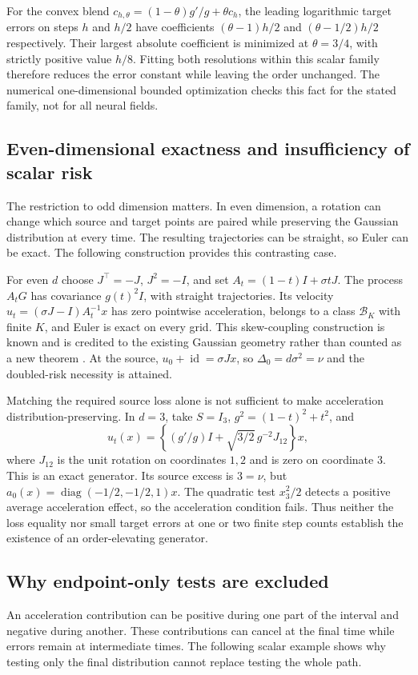 For the convex blend
$c_{h,\theta}=(1-\theta)g'/g+\theta c_h$, the leading logarithmic target
errors on steps $h$ and $h/2$ have coefficients
$(\theta-1)h/2$ and $(\theta-1/2)h/2$ respectively.
Their largest absolute coefficient is minimized at $\theta=3/4$, with
strictly positive value $h/8$. Fitting both resolutions within this scalar
family therefore reduces the error constant while leaving the order
unchanged. The numerical one-dimensional bounded optimization checks
this fact for the stated family, not for all neural fields.

\subsection{Even-dimensional exactness and insufficiency of scalar risk}
The restriction to odd dimension matters. In even dimension, a rotation
can change which source and target points are paired while preserving
the Gaussian distribution at every time. The resulting trajectories can
be straight, so Euler can be exact. The following construction provides
this contrasting case.

For even $d$ choose $J^\top=-J$, $J^2=-I$, and set
$A_t=(1-t)I+\sigma tJ$. The process $A_tG$ has covariance $g(t)^2I$,
with straight trajectories. Its velocity
$u_t=(\sigma J-I)A_t^{-1}x$ has zero pointwise acceleration, belongs to
a class $\mathcal B_K$ with finite $K$, and Euler is exact on every grid.
This skew-coupling construction is known and is credited to the existing
Gaussian geometry rather than counted as a new theorem
\citep{obzherin2026density,obzherin2026finite}.
At the source, $u_0+\operatorname{id}=\sigma Jx$, so
$\Delta_0=d\sigma^2=\nu$ and the doubled-risk necessity is attained.

Matching the required source loss alone is not sufficient to make
acceleration distribution-preserving. In $d=3$, take $S=I_3$,
$g^2=(1-t)^2+t^2$, and
\[
 u_t(x)=\left\{(g'/g)I+\sqrt{3/2}\,g^{-2}J_{12}\right\}x,
\]
where $J_{12}$ is the unit rotation on coordinates $1,2$ and is zero
on coordinate $3$. This is an exact generator. Its source excess is
$3=\nu$, but $a_0(x)=\operatorname{diag}(-1/2,-1/2,1)x$.
The quadratic test $x_3^2/2$ detects a positive average acceleration
effect, so the acceleration condition fails. Thus neither the loss equality
nor small target errors at one or two finite step counts establish the
existence of an order-elevating generator.

\subsection{Why endpoint-only tests are excluded}
An acceleration contribution can be positive during one part of the
interval and negative during another. These contributions can cancel at
the final time while errors remain at intermediate times. The following
scalar example shows why testing only the final distribution cannot
replace testing the whole path.

